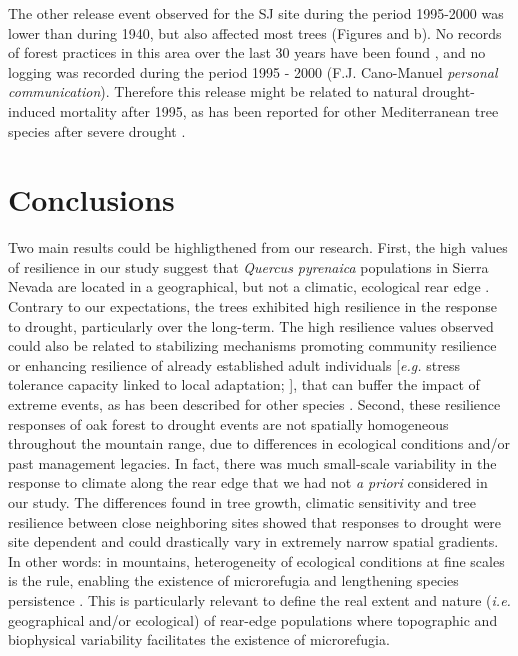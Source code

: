 The other release event observed for the SJ site during the period 1995-2000 was lower than during 1940, but also affected most trees (Figures  and  b). No records of forest practices in this area over the last 30 years have been found \autocite{Bonetetal2016HistorySierra}, and no logging was recorded during the period 1995 - 2000 (F.J. Cano-Manuel \emph{personal communication}). Therefore this release might be related to natural drought-induced mortality after 1995, as has been reported for other Mediterranean tree species after severe drought \autocites[\emph{e.g.}][]{Penuelasetal2001SevereDrought,Lloretetal2004CanopyRecovery}.

\section{Conclusions}\label{sec:dendroConclusions}
Two main results could be highligthened from our research. First, the high values of resilience in our study suggest that \emph{Quercus pyrenaica} populations in Sierra Nevada are located in a geographical, but not a climatic, ecological rear edge \autocites[\emph{sensu}][]{MartinezVilalta2018RearWindow,VilaCabreraetal2019RefiningPredictions}. Contrary to our expectations, the trees exhibited high resilience in the response to drought, particularly over the long-term. The high resilience values observed could also be related to stabilizing mechanisms promoting community resilience or enhancing resilience of already established adult individuals {[}\emph{e.g.} stress tolerance capacity linked to local adaptation; \textcite{Lloretetal2012ExtremeClimatic}{]}, that can buffer the impact of extreme events, as has been described for other species \autocite[\emph{e.g.} \emph{Pinus sylvestris},][]{HerreroZamora2014PlantResponses}. Second, these resilience responses of oak forest to drought events are not spatially homogeneous throughout the mountain range, due to differences in ecological conditions and/or past management legacies. In fact, there was much small-scale variability in the response to climate along the rear edge that we had not \emph{a priori} considered in our study. The differences found in tree growth, climatic sensitivity and tree resilience between close neighboring sites showed that responses to drought were site dependent and could drastically vary in extremely narrow spatial gradients. In other words: in mountains, heterogeneity of ecological conditions at fine scales is the rule, enabling the existence of microrefugia and lengthening species persistence \autocite{Olaldeetal2002WhiteOaks,SerraDiazetal2015DisturbanceClimate}. This is particularly relevant to define the real extent and nature (\emph{i.e.} geographical and/or ecological) of rear-edge populations where topographic and biophysical variability facilitates the existence of microrefugia.

